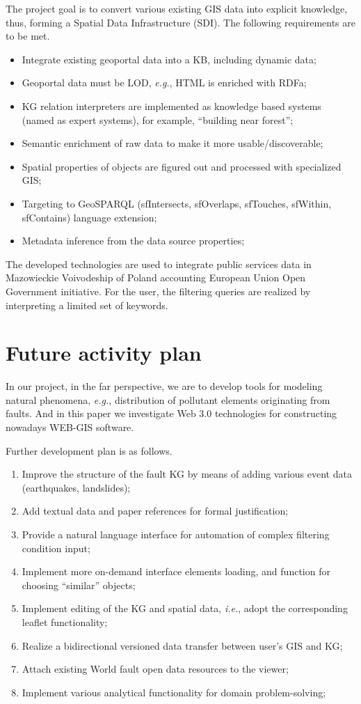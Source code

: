\documentclass[
]{ceurart}
\begin{document}
   The project \cite{iwaniak17} goal is to convert various existing GIS data into explicit knowledge, thus, forming a Spatial Data Infrastructure (SDI). The following requirements are to be met.
  \begin{itemize}
  \item Integrate existing geoportal data into a KB, including dynamic data;
  \item Geoportal data must be LOD, \emph{e.g.}, HTML is enriched with RDFa;
  \item KG relation interpreters are implemented as knowledge based systems (named as expert systems), for example, ``building near forest'';
  \item Semantic enrichment of raw data to make it more usable/discoverable;
  \item Spatial properties of objects are figured out and processed with specialized GIS;
  \item Targeting to GeoSPARQL (sfIntersects, sfOverlaps, sfTouches, sfWithin, sfContains) language extension;
  \item Metadata inference from the data source properties;
  \end{itemize}
  The developed technologies are used to integrate public services data in Mazowieckie Voivodeship of Poland accounting European Union Open Government initiative.  For the user, the filtering queries are realized by interpreting a limited set of keywords.

\section{Future activity plan}

In our project, in the far perspective, we are to develop tools for modeling natural phenomena, \emph{e.g.}, distribution of pollutant elements originating from faults.  And in this paper we investigate Web 3.0 technologies for constructing nowadays WEB-GIS software.

Further development plan is as follows.
\begin{enumerate}
\item Improve the structure of the fault KG by means of adding various event data (earthquakes, landslides);
\item Add textual data and paper references for formal justification;
\item Provide a natural language interface for automation of complex filtering condition input;
\item Implement more on-demand interface elements loading, and function for choosing ``similar'' objects;
\item Implement editing of the KG and spatial data, \emph{i.e.}, adopt the corresponding leaflet functionality;
\item Realize a bidirectional versioned data transfer between user's GIS and KG;
\item Attach existing World fault open data resources to the viewer;
\item Implement various analytical functionality for domain problem-solving;
\end{enumerate}
\end{document}

